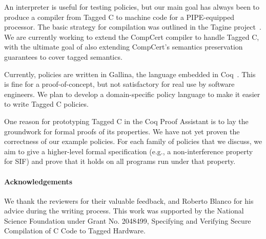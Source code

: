 \documentclass{llncs}
\begin{document}
An interpreter is useful for testing policies, but our main goal has always been to
produce a compiler from Tagged C to machine code for a PIPE-equipped processor.
The basic strategy for compilation was outlined in the Tagine project~\cite{Chhak21:Tagine}.
We are currently working to extend the CompCert compiler to handle Tagged C, with the ultimate
goal of also extending CompCert's semantics preservation guarantees to cover tagged semantics.

Currently, policies are written in Gallina, the language embedded in Coq~\cite{coq}. This is fine for a
proof-of-concept, but not satisfactory for real use by software engineers.
We plan to develop a domain-specific policy language to make it easier to write Tagged C policies.

One reason for prototyping Tagged C in the Coq Proof Assistant is to lay the groundwork
for formal proofs of its properties. We have not yet proven the correctness of our example
policies. For each family of policies that we discuss, we aim to give a higher-level formal
specification (e.g., a non-interference property for SIF) and prove that it holds on all
programs run under that property.

\paragraph{Acknowledgements}

We thank the reviewers for their valuable feedback, and Roberto Blanco for his advice during
the writing process. This work was supported by the National Science Foundation under
Grant No. 2048499, Specifying and Verifying Secure Compilation of C Code to Tagged Hardware.

\vfill
\eject


  
\end{document}
